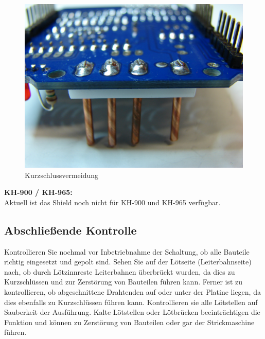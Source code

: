 \documentclass[fleqn,10pt]{SelfArx} %
\begin{document}
\begin{figure}[tbhp]\centering
\includegraphics[width=\linewidth]{abb8_2b}
\caption{Kurzschlussvermeidung}
\label{fig:abb8_2b}
\end{figure}

\FloatBarrier

\textbf{KH-900 / KH-965:} \\

Aktuell ist das Shield noch nicht für KH-900 und KH-965 verfügbar.



\subsection*{Abschließende Kontrolle}

Kontrollieren Sie nochmal vor Inbetriebnahme der Schaltung, ob alle Bauteile richtig eingesetzt und gepolt sind. Sehen Sie auf der Lötseite (Leiterbahnseite) nach, ob durch Lötzinnreste Leiterbahnen überbrückt wurden, da dies zu Kurzschlüssen und zur Zerstörung von Bauteilen führen kann. Ferner ist zu kontrollieren, ob abgeschnittene Drahtenden auf oder unter der Platine liegen, da dies ebenfalls zu Kurzschlüssen führen kann.
Kontrollieren sie alle Lötstellen auf Sauberkeit der Ausführung. Kalte Lötstellen oder Lötbrücken beeinträchtigen die Funktion und können zu Zerstörung von Bauteilen oder gar der Strickmaschine führen.
\end{document}
